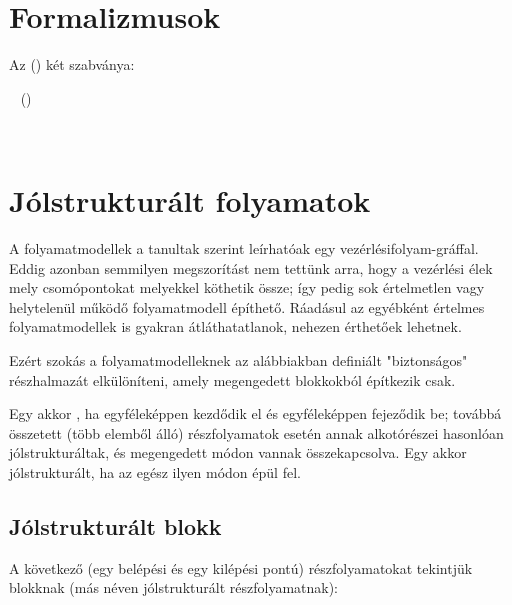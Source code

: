 \section{Formalizmusok}

Az  () két szabványa:

~\cite{UML}  ()

~\cite{omg2011bpmn}





\section{Jólstrukturált folyamatok}\label{sec:jolstrukturalt-folyamatok}

A folyamatmodellek a tanultak szerint leírhatóak egy vezérlésifolyam-gráffal. Eddig azonban semmilyen megszorítást nem tettünk arra, hogy a vezérlési élek mely csomópontokat melyekkel köthetik össze; így pedig sok értelmetlen vagy helytelenül működő folyamatmodell építhető. Ráadásul az egyébként értelmes folyamatmodellek is gyakran átláthatatlanok, nehezen érthetőek lehetnek. 

Ezért szokás a folyamatmodelleknek az alábbiakban definiált "biztonságos" részhalmazát elkülöníteni, amely megengedett blokkokból építkezik csak. 

\begin{definicio}
	Egy  akkor , ha egyféleképpen kezdődik el és egyféleképpen fejeződik be; továbbá összetett (több elemből álló) részfolyamatok esetén annak alkotórészei hasonlóan jólstrukturáltak, és megengedett módon vannak összekapcsolva. Egy  akkor jólstrukturált, ha az egész ilyen módon épül fel.
\end{definicio}

\subsection{Jólstrukturált blokk}

A következő (egy belépési és egy kilépési pontú) részfolyamatokat tekintjük  blokknak (más néven jólstrukturált részfolyamatnak):

